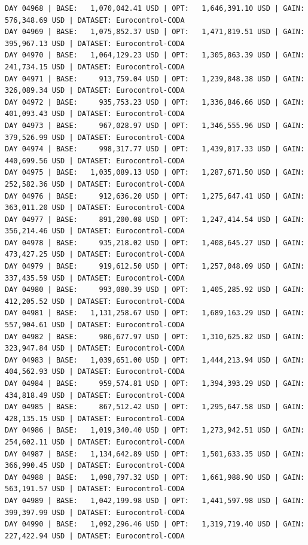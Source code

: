 \documentclass[11pt,a4paper]{article}
\begin{document}
\begin{verbatim}
DAY 04968 | BASE:   1,070,042.41 USD | OPT:   1,646,391.10 USD | GAIN: 576,348.69 USD | DATASET: Eurocontrol-CODA
DAY 04969 | BASE:   1,075,852.37 USD | OPT:   1,471,819.51 USD | GAIN: 395,967.13 USD | DATASET: Eurocontrol-CODA
DAY 04970 | BASE:   1,064,129.23 USD | OPT:   1,305,863.39 USD | GAIN: 241,734.15 USD | DATASET: Eurocontrol-CODA
DAY 04971 | BASE:     913,759.04 USD | OPT:   1,239,848.38 USD | GAIN: 326,089.34 USD | DATASET: Eurocontrol-CODA
DAY 04972 | BASE:     935,753.23 USD | OPT:   1,336,846.66 USD | GAIN: 401,093.43 USD | DATASET: Eurocontrol-CODA
DAY 04973 | BASE:     967,028.97 USD | OPT:   1,346,555.96 USD | GAIN: 379,526.99 USD | DATASET: Eurocontrol-CODA
DAY 04974 | BASE:     998,317.77 USD | OPT:   1,439,017.33 USD | GAIN: 440,699.56 USD | DATASET: Eurocontrol-CODA
DAY 04975 | BASE:   1,035,089.13 USD | OPT:   1,287,671.50 USD | GAIN: 252,582.36 USD | DATASET: Eurocontrol-CODA
DAY 04976 | BASE:     912,636.20 USD | OPT:   1,275,647.41 USD | GAIN: 363,011.20 USD | DATASET: Eurocontrol-CODA
DAY 04977 | BASE:     891,200.08 USD | OPT:   1,247,414.54 USD | GAIN: 356,214.46 USD | DATASET: Eurocontrol-CODA
DAY 04978 | BASE:     935,218.02 USD | OPT:   1,408,645.27 USD | GAIN: 473,427.25 USD | DATASET: Eurocontrol-CODA
DAY 04979 | BASE:     919,612.50 USD | OPT:   1,257,048.09 USD | GAIN: 337,435.59 USD | DATASET: Eurocontrol-CODA
DAY 04980 | BASE:     993,080.39 USD | OPT:   1,405,285.92 USD | GAIN: 412,205.52 USD | DATASET: Eurocontrol-CODA
DAY 04981 | BASE:   1,131,258.67 USD | OPT:   1,689,163.29 USD | GAIN: 557,904.61 USD | DATASET: Eurocontrol-CODA
DAY 04982 | BASE:     986,677.97 USD | OPT:   1,310,625.82 USD | GAIN: 323,947.84 USD | DATASET: Eurocontrol-CODA
DAY 04983 | BASE:   1,039,651.00 USD | OPT:   1,444,213.94 USD | GAIN: 404,562.93 USD | DATASET: Eurocontrol-CODA
DAY 04984 | BASE:     959,574.81 USD | OPT:   1,394,393.29 USD | GAIN: 434,818.49 USD | DATASET: Eurocontrol-CODA
DAY 04985 | BASE:     867,512.42 USD | OPT:   1,295,647.58 USD | GAIN: 428,135.15 USD | DATASET: Eurocontrol-CODA
DAY 04986 | BASE:   1,019,340.40 USD | OPT:   1,273,942.51 USD | GAIN: 254,602.11 USD | DATASET: Eurocontrol-CODA
DAY 04987 | BASE:   1,134,642.89 USD | OPT:   1,501,633.35 USD | GAIN: 366,990.45 USD | DATASET: Eurocontrol-CODA
DAY 04988 | BASE:   1,098,797.32 USD | OPT:   1,661,988.90 USD | GAIN: 563,191.57 USD | DATASET: Eurocontrol-CODA
DAY 04989 | BASE:   1,042,199.98 USD | OPT:   1,441,597.98 USD | GAIN: 399,397.99 USD | DATASET: Eurocontrol-CODA
DAY 04990 | BASE:   1,092,296.46 USD | OPT:   1,319,719.40 USD | GAIN: 227,422.94 USD | DATASET: Eurocontrol-CODA

\end{verbatim}
\end{document}
